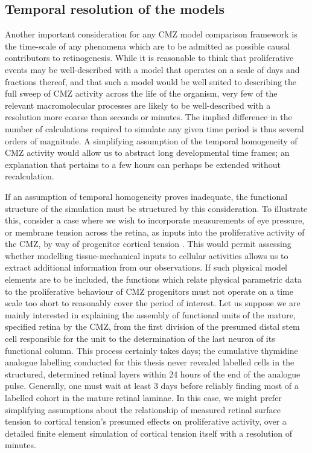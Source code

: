 \subsection{Temporal resolution of the models}
Another important consideration for any CMZ model comparison framework is the time-scale of any phenomena which are to be admitted as possible causal contributors to retinogenesis. While it is reasonable to think that proliferative events may be well-described with a model that operates on a scale of days and fractions thereof, and that such a model would be well suited to describing the full sweep of CMZ activity across the life of the organism, very few of the relevant macromolecular processes are likely to be well-described with a resolution more coarse than seconds or minutes. The implied difference in the number of calculations required to simulate any given time period is thus several orders of magnitude. A simplifying assumption of the temporal homogeneity of CMZ activity would allow us to abstract long developmental time frames; an explanation that pertains to a few hours can perhaps be extended without recalculation. 

If an assumption of temporal homogeneity proves inadequate, the functional structure of the simulation must be structured by this consideration. To illustrate this, consider a case where we wish to incorporate measurements of eye pressure, or membrane tension across the retina, as inputs into the proliferative activity of the CMZ, by way of progenitor cortical tension \cite{Winklbauer2015}. This would permit assessing whether modelling tissue-mechanical inputs to cellular activities allows us to extract additional information from our observations. If such physical model elements are to be included, the functions which relate physical parametric data to the proliferative behaviour of CMZ progenitors must not operate on a time scale too short to reasonably cover the period of interest. Let us suppose we are mainly interested in explaining the assembly of functional units of the mature, specified retina by the CMZ, from the first division of the presumed distal stem cell responsible for the unit to the determination of the last neuron of its functional column. This process certainly takes days; the cumulative thymidine analogue labelling conducted for this thesis never revealed labelled cells in the structured, determined retinal layers within 24 hours of the end of the analogue pulse. Generally, one must wait at least 3 days before reliably finding most of a labelled cohort in the mature retinal laminae. In this case, we might prefer simplifying assumptions about the relationship of measured retinal surface tension to cortical tension's presumed effects on proliferative activity, over a detailed finite element simulation of cortical tension itself with a resolution of minutes.

